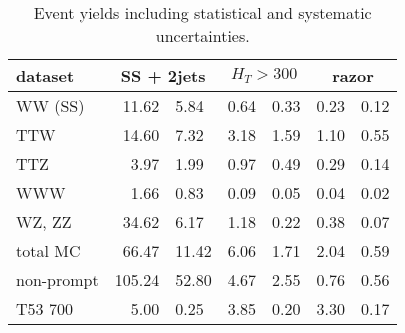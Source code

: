 \begin{table}
    \centering
    \begin{tabular}{l *3{r@{$\pm$}l}}
        \toprule
        dataset & \multicolumn{2}{c}{SS + 2jets}& \multicolumn{2}{c}{$H_T >
        300$}& \multicolumn{2}{c}{razor} \\
        \midrule
        WW (SS)& 11.62 & 5.84& 0.64 & 0.33& 0.23 & 0.12\\
        TTW& 14.60 & 7.32& 3.18 & 1.59& 1.10 & 0.55\\
        TTZ& 3.97 & 1.99& 0.97 & 0.49& 0.29 & 0.14\\
        WWW& 1.66 & 0.83& 0.09 & 0.05& 0.04 & 0.02\\
        WZ, ZZ& 34.62 & 6.17& 1.18 & 0.22& 0.38 & 0.07\\
        total MC& 66.47 & 11.42& 6.06 & 1.71& 2.04 & 0.59\\
        non-prompt & 105.24 & 52.80& 4.67 & 2.55& 0.76 & 0.56\\
        T53 700& 5.00 & 0.25& 3.85 & 0.20& 3.30 & 0.17\\
        \bottomrule
    \end{tabular}
    \caption{Event yields including statistical and systematic uncertainties.}
\end{table}

